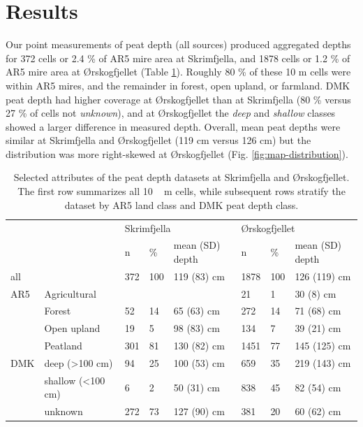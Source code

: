 \documentclass[soil, manuscript]{copernicus}
\begin{document}
\section{Results}

Our point measurements of peat depth (all sources) produced aggregated depths for 372 cells or 2.4 \% of AR5 mire area at Skrimfjella, and 1878 cells or 1.2 \% of AR5 mire area at Ørskogfjellet (Table \ref{tab:depthsByClass}).
Roughly 80 \% of these 10 m cells were within AR5 mires, and the remainder in forest, open upland, or farmland.
DMK peat depth had higher coverage at Ørskogfjellet than at Skrimfjella (80 \% versus 27 \% of cells not \emph{unknown}), and at Ørskogfjellet the \emph{deep} and \emph{shallow} classes showed a larger difference in measured depth.
Overall, mean peat depths were similar at Skrimfjella and Ørskogfjellet (119 cm versus 126 cm) but the distribution was more right-skewed at Ørskogfjellet (Fig. \ref{fig:map-distribution}).

\begin{table}[ht]
\caption{Selected attributes of the peat depth datasets at Skrimfjella and Ørskogfjellet. The first row summarizes all \unit{10\,m} cells, while subsequent rows stratify the dataset by AR5 land class and DMK peat depth class.}
\begin{tabular}{llllllll}
\hline
    &                             & \multicolumn{3}{l}{Skrimfjella} & \multicolumn{3}{l}{Ørskogfjellet} \\ \cline{3-8} 
    &                             & n     & \%   & mean (SD) depth  & n      & \%    & mean (SD) depth  \\ \cline{3-8} 
all &                             & 372   & 100  & 119 (83) cm      & 1878   & 100   & 126 (119) cm     \\
AR5 & Agricultural                &       &      &                  & 21     & 1     & 30 (8) cm        \\
    & Forest                      & 52    & 14   & 65 (63) cm       & 272    & 14    & 71 (68) cm       \\
    & Open upland                 & 19    & 5    & 98 (83) cm       & 134    & 7     & 39 (21) cm       \\
    & Peatland                    & 301   & 81   & 130 (82) cm      & 1451   & 77    & 145 (125) cm     \\
DMK & deep (\textgreater{}100 cm) & 94    & 25   & 100 (53) cm      & 659    & 35    & 219 (143) cm     \\
    & shallow (\textless{}100 cm) & 6     & 2    & 50 (31) cm       & 838    & 45    & 82 (54) cm       \\
    & unknown                     & 272   & 73   & 127 (90) cm      & 381    & 20    & 60 (62) cm       \\ \hline
\end{tabular}
\label{tab:depthsByClass}
\end{table}
\end{document}
